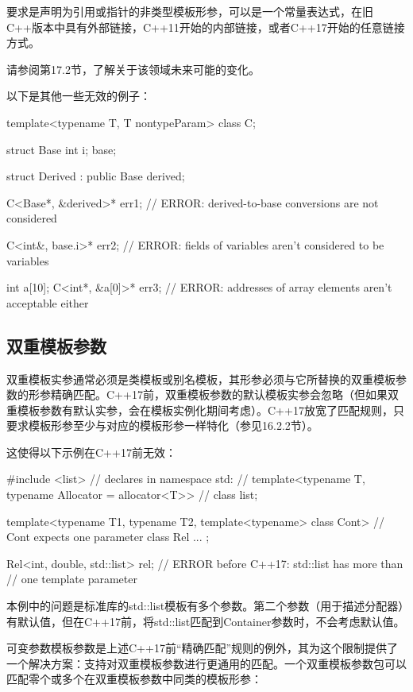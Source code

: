 要求是声明为引用或指针的非类型模板形参，可以是一个常量表达式，在旧C++版本中具有外部链接，C++11开始的内部链接，或者C++17开始的任意链接方式。

请参阅第17.2节，了解关于该领域未来可能的变化。

以下是其他一些无效的例子：

\begin{cpp}
template<typename T, T nontypeParam>
class C;

struct Base {
	int i;
} base;

struct Derived : public Base {
} derived;

C<Base*, &derived>* err1; // ERROR: derived-to-base conversions are not considered

C<int&, base.i>* err2; // ERROR: fields of variables aren't considered to be variables

int a[10];
C<int*, &a[0]>* err3; // ERROR: addresses of array elements aren't acceptable either
\end{cpp}


\subsection{双重模板参数}

双重模板实参通常必须是类模板或别名模板，其形参必须与它所替换的双重模板参数的形参精确匹配。C++17前，双重模板参数的默认模板实参会忽略（但如果双重模板参数有默认实参，会在模板实例化期间考虑）。C++17放宽了匹配规则，只要求模板形参至少与对应的模板形参一样特化（参见16.2.2节）。

这使得以下示例在C++17前无效：

\begin{cpp}
#include <list>
	// declares in namespace std:
	// template<typename T, typename Allocator = allocator<T>>
	// class list;

template<typename T1, typename T2,
		template<typename> class Cont> // Cont expects one parameter
class Rel {
	...
};

Rel<int, double, std::list> rel; // ERROR before C++17: std::list has more than
								// one template parameter
\end{cpp}

本例中的问题是标准库的std::list模板有多个参数。第二个参数（用于描述分配器）有默认值，但在C++17前，将std::list匹配到Container参数时，不会考虑默认值。

可变参数模板参数是上述C++17前“精确匹配”规则的例外，其为这个限制提供了一个解决方案：支持对双重模板参数进行更通用的匹配。一个双重模板参数包可以匹配零个或多个在双重模板参数中同类的模板形参：


